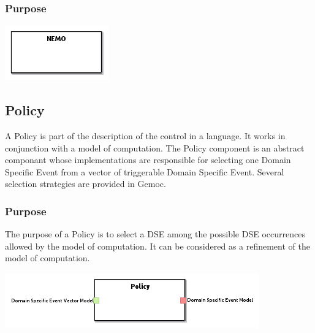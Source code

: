 \documentclass{gemoc} %
\begin{document}

\subsubsection{Purpose}


\begin{center}
\includegraphics*[trim=0.0cm 0.0cm 0cm 0.0cm, clip=true]{../images/generated/Generated_NEMO.png}
\end{center}




\subsection{Policy}
A Policy is part of the description of the control in a language. It works in conjunction with a model of computation.
The Policy component is an abstract componant whose implementations are responsible for selecting one Domain Specific Event from a vector of triggerable Domain Specific Event. Several selection strategies are provided in Gemoc.

\subsubsection{Purpose}
The purpose of a Policy is to select a DSE among the possible DSE occurrences allowed by the model of computation. It can be considered as a refinement of the model of computation.

\begin{center}
\includegraphics*[trim=0.0cm 0.0cm 0cm 0.0cm, clip=true]{../images/generated/Generated_Policy.png}
\end{center}
\end{document}
